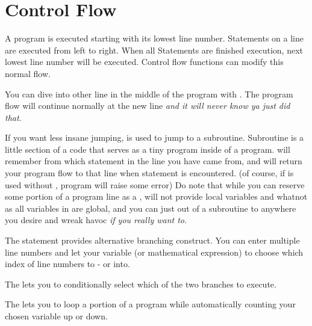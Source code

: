 \section{Control Flow}

A program is executed starting with its lowest line number. Statements on a line are executed from left to right. When all Statements are finished execution, next lowest line number will be executed. Control flow functions can modify this normal flow.

You can dive into other line in the middle of the program with . The program flow will continue normally at the new line \emph{and it will never know ya just did that}.

If you want less insane jumping,  is used to jump to a subroutine. Subroutine is a little section of a code that serves as a tiny program inside of a program.  will remember from which statement in the line you have came from, and will return your program flow to that line when  statement is encountered. (of course, if  is used without , program will raise some error) Do note that while you can reserve some portion of a program line as a , \tbas{} will not provide local variables and whatnot as all variables in \tbas{} are global, and you can just  out of a subroutine to anywhere you desire and wreak havoc \emph{if you really want to}.

The  statement provides alternative branching construct. You can enter multiple line numbers and let your variable (or mathematical expression) to choose which index of line numbers to - or  into.

The  lets you to conditionally select which of the two branches to execute.

The  lets you to loop a portion of a program while automatically counting your chosen variable up or down.
